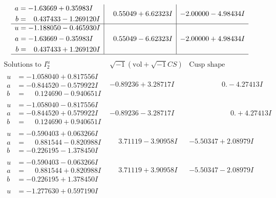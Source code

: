 \documentclass[1p]{elsarticle_modified}
\theoremstyle{definition}
\newcommand{\I}{\sqrt{-1}}
\begin{document}
$$\begin{array}{c|c|c}
\begin{aligned}
a &= -1.63669 + 0.35983 I \\
b &= \phantom{-}0.437433 - 1.269120 I\end{aligned}
 & \phantom{-}0.55049 + 6.62323 I & -2.00000 - 4.98434 I \\ \hline\begin{aligned}
u &= -1.188050 - 0.465930 I \\
a &= -1.63669 - 0.35983 I \\
b &= \phantom{-}0.437433 + 1.269120 I\end{aligned}
 & \phantom{-}0.55049 - 6.62323 I & -2.00000 + 4.98434 I\\
 \hline 
 \end{array}$$\newpage$$\begin{array}{c|c|c}  
\text{Solutions to }I^u_{2}& \I (\text{vol} + \sqrt{-1}CS) & \text{Cusp shape}\\
 \hline 
\begin{aligned}
u &= -1.058040 + 0.817556 I \\
a &= -0.844520 - 0.579922 I \\
b &= \phantom{-}0.124690 - 0.940651 I\end{aligned}
 & -0.89236 + 3.28717 I & \phantom{-0.000000 } 0. - 4.27413 I \\ \hline\begin{aligned}
u &= -1.058040 - 0.817556 I \\
a &= -0.844520 + 0.579922 I \\
b &= \phantom{-}0.124690 + 0.940651 I\end{aligned}
 & -0.89236 - 3.28717 I & \phantom{-0.000000 -}0. + 4.27413 I \\ \hline\begin{aligned}
u &= -0.590403 + 0.063266 I \\
a &= \phantom{-}0.881544 - 0.820988 I \\
b &= -0.226195 - 1.378450 I\end{aligned}
 & \phantom{-}3.71119 - 3.90958 I & -5.50347 + 2.08979 I \\ \hline\begin{aligned}
u &= -0.590403 - 0.063266 I \\
a &= \phantom{-}0.881544 + 0.820988 I \\
b &= -0.226195 + 1.378450 I\end{aligned}
 & \phantom{-}3.71119 + 3.90958 I & -5.50347 - 2.08979 I \\ \hline\begin{aligned}
u &= -1.277630 + 0.597190 I \\

\end{aligned}
\end{array}$$
\end{document}
